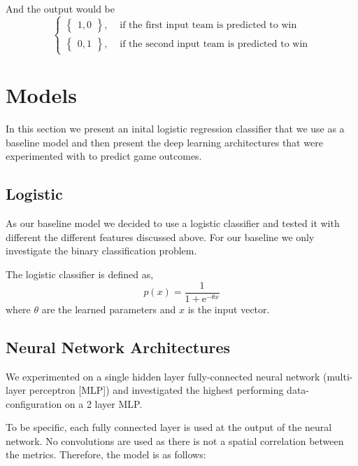 \documentclass{article} %
\begin{document}
And the output would be
\[
\begin{cases}
  \begin{Bmatrix} 1, 0 \end{Bmatrix}, & \mbox{ if the first input team is predicted to win}\\
  \begin{Bmatrix} 0, 1 \end{Bmatrix}, & \mbox{ if the second input team is predicted to win}
\end{cases}
\]




\section{Models}
\label{sec:models}
In this section we present an inital logistic regression classifier that we use as a baseline model and then present the deep learning architectures that were experimented with to predict game outcomes.


\subsection{Logistic}
\label{sec:model-logistic}

As our baseline model we decided to use a logistic classifier and tested it with different the different features discussed above.
For our baseline we only investigate the binary classification problem.

The logistic classifier is defined as,
\begin{equation} 
\label{eqn:logistic}
p(x) = \frac{1}{1 + \mathrm{e}^{-\theta x}}
\end{equation}
where $\theta$ are the learned parameters and $x$ is the input vector.


\subsection{Neural Network Architectures}
\label{sec:nn-architectures}

We experimented on a single hidden layer fully-connected neural network (multi-layer perceptron [MLP]) and investigated the highest performing data-configuration on a 2 layer MLP.

To be specific, each fully connected layer is used at the output of the neural network. No convolutions are used as there is not a spatial correlation between the metrics.
Therefore, the model is as follows:
\end{document}
